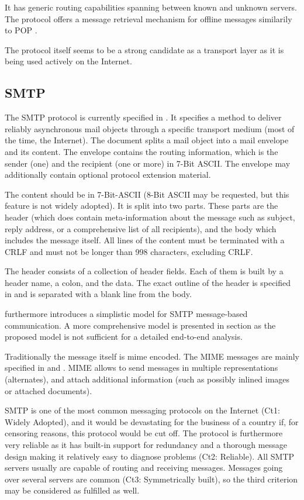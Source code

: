 \documentclass[a4paper,appendixprefix,pdfusetitle,twocolumn,fontsize=8pt,DIV=calc,8pt,draft]{\doctype} %
\begin{document}
It has generic routing capabilities spanning between known and unknown servers. The protocol offers a message retrieval mechanism for offline messages similarily to POP \cite{xep0013}.

The protocol itself seems to be a strong candidate as a transport layer as it is being used actively on the Internet.

\subsection{SMTP}
The SMTP protocol is currently specified in \cite{RFC5321}. It specifies a method to deliver reliably asynchronous mail objects through a specific transport medium (most of the time, the Internet). The document splits a mail object into a mail envelope and its content. The envelope contains the routing information, which is the sender (one) and the recipient (one or more) in 7-Bit ASCII. The envelope may additionally contain optional protocol extension material. 

The content should be in 7-Bit-ASCII (8-Bit ASCII may be requested, but this feature is not widely adopted). It is split into two parts. These parts are the header (which does contain meta-information about the message such as subject, reply address, or a comprehensive list of all recipients), and the body which includes the message itself. All lines of the content must be terminated with a CRLF and must not be longer than 998 characters, excluding CRLF.

The header consists of a collection of header fields. Each of them is built by a header name, a colon, and the data. The exact outline of the header is specified in \cite{RFC5322} and is separated with a blank line from the body. 

\cite{RFC5321} furthermore introduces a simplistic model for SMTP message-based communication. A more comprehensive model is presented in section  as the proposed model is not sufficient for a detailed end-to-end analysis.

Traditionally the message itself is mime encoded. The MIME messages are mainly specified in \cite{RFC2045} and \cite{RFC2046}. MIME allows to send messages in multiple representations (alternates), and attach additional information (such as possibly inlined images or attached documents). 

SMTP is one of the most common messaging protocols on the Internet (Ct1: Widely Adopted), and it would be devastating for the business of a country if, for censoring reasons, this protocol would be cut off. The protocol is furthermore very reliable as it has built-in support for redundancy and a thorough message design making it relatively easy to diagnose problems (Ct2: Reliable). All SMTP servers usually are capable of routing and receiving messages. Messages going over several servers are common (Ct3: Symmetrically built), so the third criterion may be considered as fulfilled as well.
\end{document}
